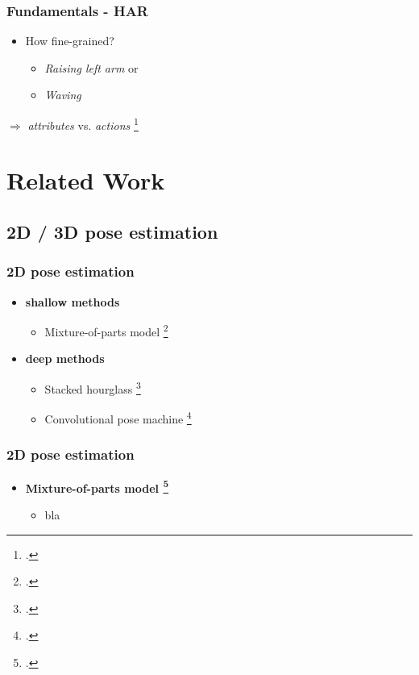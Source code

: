 \documentclass[9pt]{beamer}
\providecommand{\fcite}[1]{\footcite{#1}}
\newenvironment{myframe}[1][]{%
\begin{frame}%
\frametitle{#1}
\setcounter{footnote}{0}


}{%
\end{frame}%
}
\begin{document}
\begin{myframe}[Fundamentals - HAR]
    \begin{itemize}
        \item How fine-grained?
        \begin{itemize}
            \item \textit{Raising left arm} or
            \item \textit{Waving}
        \end{itemize}
    \end{itemize}
    $\Rightarrow$ \textit{attributes} vs. \textit{actions} \fcite{reining_towards_2018}
\end{myframe}
\section{Related Work}
\subsection{2D / 3D pose estimation}

\begin{myframe}[2D pose estimation]
  \begin{itemize}
    \item \textbf{shallow methods}
    \begin{itemize}
      \item Mixture-of-parts model \fcite{yang_articulated_2011}
    \end{itemize}
    \item \textbf{deep methods}
    \begin{itemize}
      \item Stacked hourglass \fcite{newell_stacked_2016}
      \item Convolutional pose machine \fcite{wei_convolutional_2016}
    \end{itemize}
  \end{itemize}
\end{myframe}

\begin{myframe}[2D pose estimation]
    \begin{itemize}
      \item \textbf{Mixture-of-parts model \fcite{yang_articulated_2011}}
      \begin{itemize}
        \item bla
      \end{itemize}
    \end{itemize}
\end{myframe}
\end{document}
